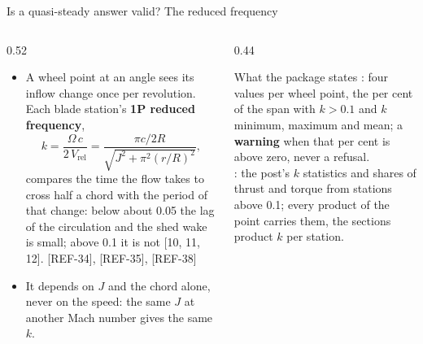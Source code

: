 \begin{frame}{Is a quasi-steady answer valid? The reduced frequency}
\begin{columns}[T]
\begin{column}{0.52\textwidth}
\begin{itemize}\small
  \item A wheel point at an angle sees its inflow change once per
        revolution. Each blade station's \textbf{1P reduced frequency},
        \[ k = \frac{\Omega\,c}{2\,V_\mathrm{rel}}
             = \frac{\pi c / 2R}{\sqrt{J^2 + \pi^2 (r/R)^2}}, \]
        compares the time the flow takes to cross half a chord with the
        period of that change: below about 0.05 the lag of the circulation
        and the shed wake is small; above 0.1 it is not [10, 11, 12]. [REF-34], [REF-35], [REF-38]
  \item It depends on \(J\) and the chord alone, never on the speed: the
        same \(J\) at another Mach number gives the same \(k\).
\end{itemize}
\end{column}
\begin{column}{0.44\textwidth}
\begin{block}{What the package states}
\small {}: four values per wheel point, the per cent of the span
with \(k > 0.1\) and \(k\) minimum, maximum and mean; a \textbf{warning} when
that per cent is above zero, never a refusal.\\[1mm]
: the post's \(k\) statistics and shares
of thrust and torque from stations above 0.1; every product
of the point carries them, the sections product \(k\) per station.
\end{block}
\end{column}
\end{columns}
\end{frame}

